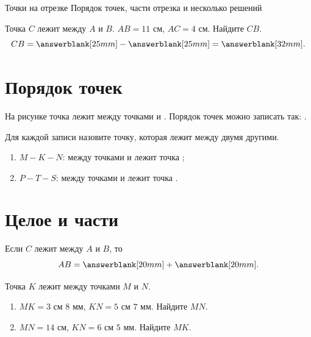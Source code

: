 
\worksheettitle
  {Точки на отрезке}
  {Порядок точек, части отрезка и несколько решений}

\studentnameblock

\begin{checkpointbox}
  Точка \(C\) лежит между \(A\) и \(B\). \(AB=11\text{ см}\),
  \(AC=4\text{ см}\). Найдите \(CB\).
  \[
    CB=\answerblank[25mm]-\answerblank[25mm]=\answerblank[32mm].
  \]
\end{checkpointbox}

\section{Порядок точек}

\betweenfigure

\begin{fillbox}[Дополните]
  На рисунке точка \answerblank[13mm] лежит между точками
  \answerblank[13mm] и \answerblank[13mm]. Порядок точек можно записать
  так: \answerblank[38mm].
\end{fillbox}

\begin{practicebox}
  Для каждой записи назовите точку, которая лежит между двумя другими.
  \begin{enumerate}[label=\alph*),itemsep=0.45em]
    \item \(M-K-N\): между точками \answerblank[13mm] и
      \answerblank[13mm] лежит точка \answerblank[13mm];
    \item \(P-T-S\): между точками \answerblank[13mm] и
      \answerblank[13mm] лежит точка \answerblank[13mm].
  \end{enumerate}
\end{practicebox}

\section{Целое и части}

\wholepartsfigure

\begin{fillbox}
  Если \(C\) лежит между \(A\) и \(B\), то
  \[
    AB=\answerblank[20mm]+\answerblank[20mm].
  \]
\end{fillbox}

\begin{practicebox}[Задание 2]
  Точка \(K\) лежит между точками \(M\) и \(N\).
  \begin{enumerate}[label=\alph*),itemsep=0.55em]
    \item \(MK=3\text{ см }8\text{ мм}\), \(KN=5\text{ см }7\text{ мм}\).
      Найдите \(MN\).
    \item \(MN=14\text{ см}\), \(KN=6\text{ см }5\text{ мм}\).
      Найдите \(MK\).
  \end{enumerate}
\end{practicebox}

